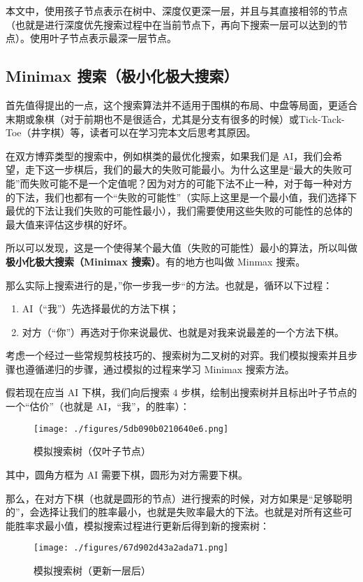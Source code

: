 

本文中，使用孩子节点表示在树中、深度仅更深一层，并且与其直接相邻的节点（也就是进行深度优先搜索过程中在当前节点下，再向下搜索一层可以达到的节点）。使用叶子节点表示最深一层节点。



\subsection{Minimax 搜索（极小化极大搜索）}
首先值得提出的一点，这个搜索算法并不适用于围棋的布局、中盘等局面，更适合末期或象棋（对于前期也不是很适合，尤其是分支有很多的时候）或Tick-Tack-Toe（井字棋）等，读者可以在学习完本文后思考其原因。

在双方博弈类型的搜索中，例如棋类的最优化搜索，如果我们是 AI，我们会希望，走下这一步棋后，我们的最大的失败可能最小。为什么这里是“最大的失败可能”而失败可能不是一个定值呢？因为对方的可能下法不止一种，对于每一种对方的下法，我们也都有一个“失败的可能性”（实际上这里是一个最小值，我们选择下最优的下法让我们失败的可能性最小），我们需要使用这些失败的可能性的总体的最大值来评估这步棋的好坏。

所以可以发现，这是一个使得某个最大值（失败的可能性）最小的算法，所以叫做\textbf{极小化极大搜索（Minimax 搜索）}。有的地方也叫做 Minmax 搜索。

那么实际上搜索进行的是，”你一步我一步“的方法。也就是，循环以下过程：
\begin{enumerate}
\item AI（“我”）先选择最优的方法下棋；
\item 对方（“你”）再选对于你来说最优、也就是对我来说最差的一个方法下棋。
\end{enumerate}
考虑一个经过一些常规剪枝技巧的、搜索树为二叉树的对弈。我们模拟搜索并且步骤也遵循递归的步骤，通过模拟的过程来学习 Minimax 搜索方法。

假若现在应当 AI 下棋，我们向后搜索 $4$ 步棋，绘制出搜索树并且标出叶子节点的一个“估价”（也就是 AI，“我”，的胜率）：
\begin{figure}[ht]
\centering
\texttt{[image: ./figures/5db090b0210640e6.png]}
\caption{模拟搜索树（仅叶子节点）} \label{fig_mmsab_1}
\end{figure}
其中，圆角方框为 AI 需要下棋，圆形为对方需要下棋。

那么，在对方下棋（也就是圆形的节点）进行搜索的时候，对方如果是“足够聪明的”，会选择让我们的胜率最小，也就是失败率最大的下法。也就是对所有这些可能胜率求最小值，模拟搜索过程进行更新后得到新的搜索树：
\begin{figure}[ht]
\centering
\texttt{[image: ./figures/67d902d43a2ada71.png]}
\caption{模拟搜索树（更新一层后）} \label{fig_mmsab_3}
\end{figure}

